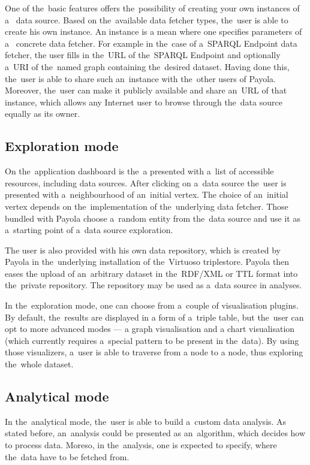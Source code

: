 One of the~basic features offers the~possibility of creating your own instances of a~
data source. Based on the~available data fetcher types, the~user is able to create 
his own instance. An instance is a mean where one specifies parameters of a~
concrete data fetcher. For example in the~case of a~SPARQL Endpoint data fetcher,
the user fills in the~URL of the~SPARQL Endpoint and optionally a~URI of the~named graph 
containing the~desired dataset. Having done this, the~user is able to share 
such an~instance with the~other users of Payola.
Moreover, the~user can make it 
publicly available and share an~URL of that instance, which allows any 
Internet user to browse through the~data source equally as its owner.

\subsection{Exploration mode}
On the~application dashboard is the~a presented with a~list of accessible 
resources, including data sources. After clicking on a~data source the~user is
presented with a~neighbourhood of an~initial vertex. The choice of an~initial vertex
depends on the~implementation of the~underlying data fetcher.
Those bundled with Payola choose a~random entity from the~data source
and use it as a~starting point of a~data source exploration.

The user is also provided with his own data repository, which is created by 
Payola in the~underlying installation of the~Virtuoso triplestore. Payola then eases 
the upload of an~arbitrary dataset in the~RDF/XML or TTL 
format into the~private repository. The repository may be used as a~data source in analyses.

In the~exploration mode, one can choose from a~couple of visualisation plugins. 
By default, the~results are displayed in a form of a~triple table, but the~user can 
opt to more advanced modes --- a graph visualisation and a chart visualisation
(which currently requires a~special pattern to be present in the~data). By using those 
visualizers, a~user is able to traverse from a node to a node, thus exploring the~whole 
dataset.

\subsection{Analytical mode}
In the~analytical mode, the~user is able to build a~custom data analysis. As 
stated before, an~analysis could be presented as an~algorithm, which decides 
how to process data. Moreso, in the~analysis, one is expected to specify, 
where the~data have to be fetched from.

